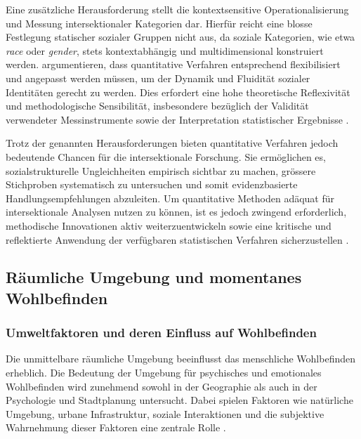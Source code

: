 Eine zusätzliche Herausforderung stellt die kontextsensitive Operationalisierung und Messung intersektionaler Kategorien dar. Hierfür reicht eine blosse Festlegung statischer sozialer Gruppen nicht aus, da soziale Kategorien, wie etwa \emph{race} oder \emph{gender}, stets kontextabhängig und multidimensional konstruiert werden. \textcite{rodo-de-zarateDevelopingGeographiesIntersectionality2014, rodo-de-zarateYoungLesbiansNegotiating2015} argumentieren, dass quantitative Verfahren entsprechend flexibilisiert und angepasst werden müssen, um der Dynamik und Fluidität sozialer Identitäten gerecht zu werden. Dies erfordert eine hohe theoretische Reflexivität und methodologische Sensibilität, insbesondere bezüglich der Validität verwendeter Messinstrumente sowie der Interpretation statistischer Ergebnisse \parencite{bauerIntersectionalityQuantitativeResearch2021, websterCenteringSocialtechnicalRelations2021}.

Trotz der genannten Herausforderungen bieten quantitative Verfahren jedoch bedeutende Chancen für die intersektionale Forschung. Sie ermöglichen es, sozialstrukturelle Ungleichheiten empirisch sichtbar zu machen, grössere Stichproben systematisch zu untersuchen und somit evidenzbasierte Handlungsempfehlungen abzuleiten. Um quantitative Methoden adäquat für intersektionale Analysen nutzen zu können, ist es jedoch zwingend erforderlich, methodische Innovationen aktiv weiterzuentwickeln sowie eine kritische und reflektierte Anwendung der verfügbaren statistischen Verfahren sicherzustellen \parencite{bauerIntersectionalityQuantitativeResearch2021, bauerAdvancingQuantitativeIntersectionality2019, scottIntersectionalityQuantitativeMethods2017}.


\subsection{Räumliche Umgebung und momentanes Wohlbefinden}

\subsubsection{Umweltfaktoren und deren Einfluss auf Wohlbefinden}

Die unmittelbare räumliche Umgebung beeinflusst das menschliche Wohlbefinden erheblich. Die Bedeutung der Umgebung für psychisches und emotionales Wohlbefinden wird zunehmend sowohl in der Geographie als auch in der Psychologie und Stadtplanung untersucht. Dabei spielen Faktoren wie natürliche Umgebung, urbane Infrastruktur, soziale Interaktionen und die subjektive Wahrnehmung dieser Faktoren eine zentrale Rolle \parencite{birenboimInfluenceUrbanEnvironments2018, hammoudSmartphonebasedEcologicalMomentary2024, chenPerceivedUrbanEnvironment2025}.

